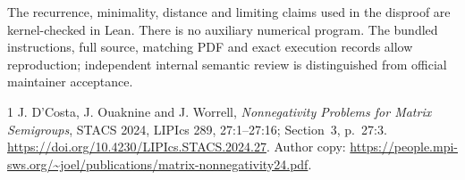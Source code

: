\documentclass[10pt]{article}
\begin{document}
The recurrence, minimality, distance and limiting claims used in the disproof are kernel-checked in Lean. There is no auxiliary numerical program. The bundled instructions, full source, matching PDF and exact execution records allow reproduction; independent internal semantic review is distinguished from official maintainer acceptance.

\begin{thebibliography}{1}
 J. D'Costa, J. Ouaknine and J. Worrell, \emph{Nonnegativity Problems for Matrix Semigroups}, STACS 2024, LIPIcs 289, 27:1--27:16; Section~3, p.~27:3. \url{https://doi.org/10.4230/LIPIcs.STACS.2024.27}. Author copy: \url{https://people.mpi-sws.org/~joel/publications/matrix-nonnegativity24.pdf}.
\end{thebibliography}
\end{document}
